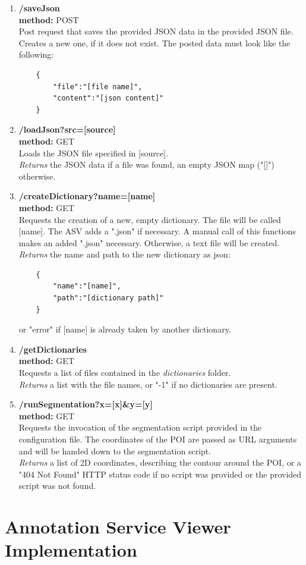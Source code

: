 \begin{enumerate}[(1) -]
	\item \textbf{/saveJson\\
	method:} POST\\
	Post request that saves the provided JSON data in the provided JSON file. Creates a new one, if it does not exist. The posted data must look like the following:
	\begin{lstlisting}
	{
		"file":"[file name]",
		"content":"[json content]"
	}
	\end{lstlisting}
		
	\item \textbf{/loadJson?src=[source]\\
	method:} GET\\
	Loads the JSON file specified in [source].\\
	\emph{Returns} the JSON data if a file was found, an empty JSON map ("[]") otherwise.
	
	\item \textbf{/createDictionary?name=[name]\\
	method:} GET\\
	Requests the creation of a new, empty dictionary. The file will be called [name]. The ASV adds a ".json" if necessary. A manual call of this functions makes an added ".json" necessary. Otherwise, a text file will be created.\\
	\emph{Returns} the name and path to the new dictionary as json:
	\begin{lstlisting}
	{
		"name":"[name]",
		"path":"[dictionary path]"
	}
	\end{lstlisting}
	or "error" if [name] is already taken by another dictionary.
	
	\item \textbf{/getDictionaries\\
	method:} GET\\
	Requests a list of files contained in the \emph{dictionaries} folder.\\
	\emph{Returns} a list with the file names, or "-1" if no dictionaries are present.
	
	\item \textbf{/runSegmentation?x=[x]\&y=[y]\\
		method:} GET\\
	Requests the invocation of the segmentation script provided in the configuration file. The coordinates of the POI are passed as URL arguments and will be handed down to the segmentation script.\\
	\emph{Returns} a list of 2D coordinates, describing the contour around the POI, or a "404 Not Found" HTTP status code if no script was provided or the provided script was not found.
\end{enumerate}


\section{Annotation Service Viewer Implementation}
